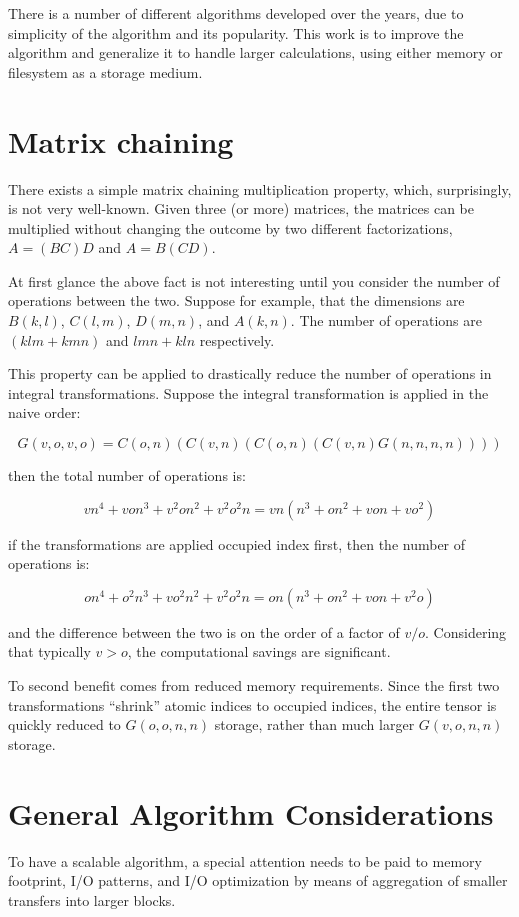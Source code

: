 \documentclass[12pt]{article} \usepackage[margin=1in]{geometry}
\begin{document}
There is a number of different algorithms developed over the years,
\cite{head1988MP2, frisch1990semi, wong1996parallel,schutz1997integral,
  fletcher1997parallel, ford2007array, ishimura2006new}
due to simplicity of the algorithm and its popularity.
This work is to improve the algorithm and generalize it to handle
larger calculations, using either memory or filesystem as a storage
medium.

\section {Matrix chaining}
There exists a simple matrix chaining multiplication property, which,
surprisingly, is not very well-known.  Given three (or more) matrices,
the matrices can be multiplied without changing the outcome by two
different factorizations, $A = (BC)D$ and $A = B(CD)$.

At first glance the above fact is not interesting until you consider
the number of operations between the two.  Suppose for example, that
the dimensions are $B(k,l)$, $C(l,m)$, $D(m,n)$, and $A(k,n)$.  The
number of operations are $(klm + kmn)$ and $lmn + kln$ respectively.

This property can be applied to drastically reduce the number of
operations in integral transformations.  Suppose the integral
transformation is applied in the naive order:

$$G(v,o,v,o) = C(o,n)(C(v,n)(C(o,n)(C(v,n)G(n,n,n,n))))$$

then the total number of operations is:

$$v n^4 + v o n^3 + v^2 o n^2 + v^2 o^2 n = v n (n^3 + o n^2 + v o n +
vo^2)$$

if the transformations are applied occupied index first, then the
number of operations is:

$$o n^4 + o^2 n^3 + v o^2 n^2 + v^2 o^2 n = o n (n^3 + o n^2 + v o n +
v^2 o)$$

and the difference between the two is on the order of a factor of
$v/o$.  Considering that typically $v > o$, the computational savings
are significant.

To second benefit comes from reduced memory requirements.  Since the
first two transformations ``shrink'' atomic indices to occupied
indices, the entire tensor is quickly reduced to $G(o,o,n,n)$ storage,
rather than much larger $G(v,o,n,n)$ storage.

\section{General Algorithm Considerations}
To have a scalable algorithm, a special attention needs to be paid to
memory footprint, I/O patterns, and I/O optimization by means of
aggregation of smaller transfers into larger blocks.
\end{document}
